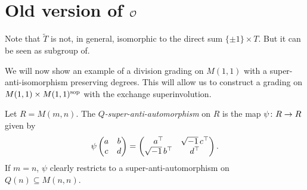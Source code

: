 

%
%
%
% 

\section{Old version of $\mathcal O$}

Note that $\widetilde T$ is not, in general, isomorphic to the direct sum $\{ \pm 1 \} \times T$.
But it can be seen as subgroup of.

We will now show an example of a division grading on $M(1,1)$ with a super-anti-isomorphism preserving degrees.
This will allow us to construct a grading on $M(1,1) \times M(1,1)^{\mathrm{sop}}$ with the exchange superinvolution.

\begin{defi}
	Let $R = M(m,n)$.
	The \emph{$Q$-super-anti-automorphism} on $R$ is the map
	$\psi\colon R \to R$ given by
	\[
		\psi \begin{pmatrix}
			a & b \\
			c & d
		\end{pmatrix} =
		\begin{pmatrix}
			a^{\top}             & \sqrt{-1}\, c^{\top} \\
			\sqrt{-1}\, b^{\top} & d^{\top}
		\end{pmatrix}.
	\]
	If $m = n$, $\psi$ clearly restricts to a super-anti-automorphism on $Q(n) \subseteq M(n,n)$.
\end{defi}


